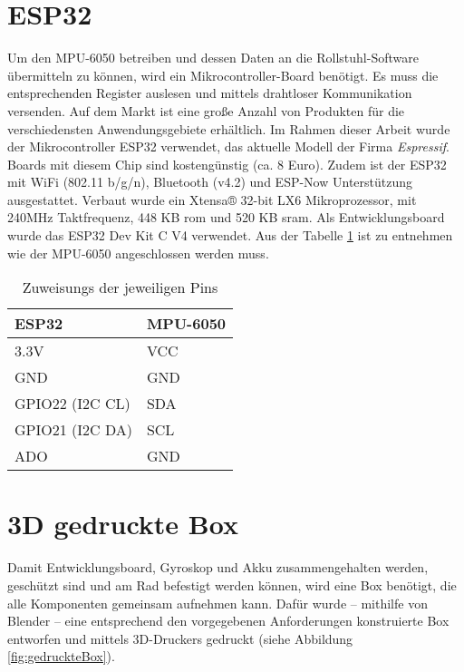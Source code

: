 \section{ESP32}
Um den MPU-6050 betreiben und dessen Daten an die Rollstuhl-Software übermitteln zu können, wird ein Mikrocontroller-Board benötigt.
Es muss die entsprechenden Register auslesen und mittels drahtloser Kommunikation versenden.
Auf dem Markt ist eine große Anzahl von Produkten für die verschiedensten Anwendungsgebiete erhältlich.
Im Rahmen dieser Arbeit wurde der Mikrocontroller ESP32 verwendet, das aktuelle Modell der Firma \textit{Espressif}.
Boards mit diesem Chip sind kostengünstig (ca. 8 Euro).
Zudem ist der ESP32 mit WiFi (802.11 b/g/n), Bluetooth (v4.2) und ESP-Now Unterstützung ausgestattet\cite{ESP32Datasheet2022}.
Verbaut wurde ein Xtensa® 32-bit LX6 Mikroprozessor, mit 240MHz Taktfrequenz, 448 KB \ac{rom} und 520 KB \ac{sram}\cite{ESP32Datasheet2022}.
Als Entwicklungsboard wurde das ESP32 Dev Kit C V4 verwendet.
Aus der Tabelle \ref{tab:pinZuweisung} ist zu entnehmen wie der MPU-6050 angeschlossen werden muss.
\begin{table}[h]
    \centering
    \begin{threeparttable}
        \caption{Zuweisungs der jeweiligen Pins}
        \begin{tabular}{|l|l|}
            \hline
            \textbf{ESP32}                          & \textbf{MPU-6050}           \\ \hline
            \parbox[c][0.5cm]{3cm}{3.3V}            & \parbox[c][0.5cm]{3cm}{VCC} \\ \hline
            \parbox[c][0.5cm]{3cm}{GND}             & \parbox[c][0.5cm]{3cm}{GND} \\ \hline
            \parbox[c][0.5cm]{3cm}{GPIO22 (I2C CL)} & \parbox[c][0.5cm]{3cm}{SDA} \\ \hline
            \parbox[c][0.5cm]{3cm}{GPIO21 (I2C DA)} & \parbox[c][0.5cm]{3cm}{SCL} \\ \hline
            \parbox[c][0.5cm]{3cm}{ADO}             & \parbox[c][0.5cm]{3cm}{GND} \\ \hline
        \end{tabular}
        \label{tab:pinZuweisung}
    \end{threeparttable}
\end{table}

\section{3D gedruckte Box}
Damit Entwicklungsboard, Gyroskop und Akku zusammengehalten werden, geschützt sind und am Rad befestigt werden können, wird eine Box benötigt, die alle Komponenten gemeinsam aufnehmen kann.
Dafür wurde – mithilfe von Blender – eine entsprechend den vorgegebenen Anforderungen konstruierte Box entworfen und mittels 3D-Druckers gedruckt (siehe Abbildung \ref{fig:gedruckteBox}).


